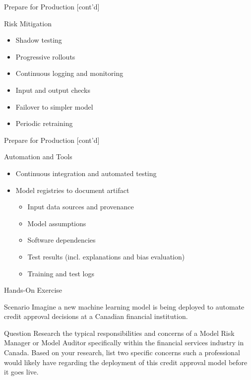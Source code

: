 \documentclass[ignorenonframetext,xcolor=x11names]{beamer}
\begin{document}
\begin{frame}{Prepare for Production \small [cont'd]}
\begin{block}{Risk Mitigation}
\begin{itemize}
   \item Shadow testing
   \item Progressive rollouts
   \item Continuous logging and monitoring
   \item Input and output checks
   \item Failover to simpler model
   \item Periodic retraining
\end{itemize}
\end{block}
\end{frame}

\begin{frame}{Prepare for Production \small [cont'd]}
\begin{block}{Automation and Tools}
\begin{itemize}
   \item Continuous integration and automated testing
   \item Model registries to document artifact
   \begin{itemize}
      \item Input data sources and provenance
      \item Model assumptions
      \item Software dependencies
      \item Test results (incl. explanations and bias evaluation)
      \item Training and test logs
   \end{itemize}
\end{itemize}
\end{block}
\end{frame}   

\begin{frame}{Hands-On Exercise}

\begin{block}{Scenario}
Imagine a new machine learning model is being deployed to automate credit approval decisions at a Canadian financial institution.
\end{block}

\begin{block}{Question}
Research the typical responsibilities and concerns of a Model Risk Manager or Model Auditor specifically within the financial services industry in Canada. Based on your research, list two specific concerns such a professional would likely have regarding the deployment of this credit approval model before it goes live.
\end{block}
\end{frame}
\end{document}
